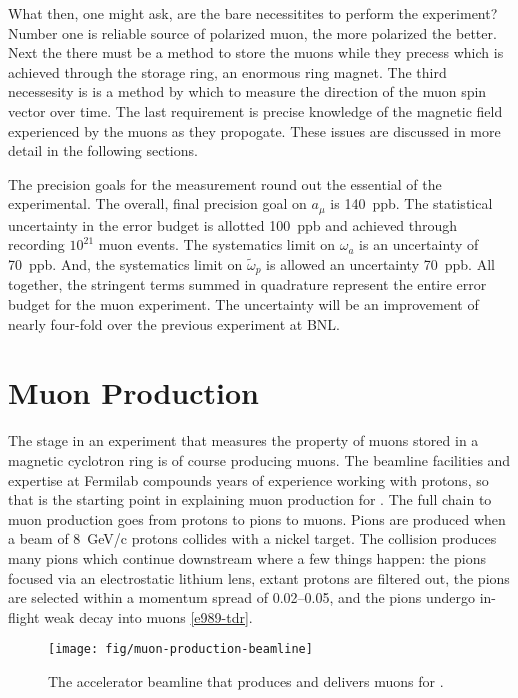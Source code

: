 What then, one might ask, are the bare necessitites to perform the \gmtwo experiment?  Number one is reliable source of polarized muon, the more polarized the better.  Next the there must be a method to store the muons while they precess which is achieved through the \gmtwo storage ring, an enormous ring magnet.  The third necessesity is is a method by which to measure the direction of the muon spin vector over time.  The last requirement is precise knowledge of the magnetic field experienced by the muons as they propogate.  These issues are discussed in more detail in the following sections.

The precision goals for the measurement round out the essential of the experimental.  The overall, final precision goal on $a_\mu$ is \SI{140}{ppb}.  The statistical uncertainty in the error budget is allotted \SI{100}{ppb} and achieved through recording $10^{21}$ muon events.  The systematics limit on $\omega_a$ is an uncertainty of \SI{70}{ppb}.  And, the systematics limit on $\tilde{\omega}_p$ is allowed an uncertainty \SI{70}{ppb}.  All together, the stringent terms summed in quadrature represent the entire error budget for the muon \gmtwo experiment.  The uncertainty will be an improvement of nearly four-fold over the previous experiment at BNL.

\section{Muon Production} \label{sec:muon-production}

The stage in an experiment that measures the property of muons stored in a magnetic cyclotron ring is of course producing muons.  The beamline facilities and expertise at Fermilab compounds years of experience working with protons, so that is the starting point in explaining muon production for \gmtwo.  The full chain to muon production goes from protons to pions to muons.  Pions are produced when a beam of \SI{8}{\GeV/c} protons collides with a nickel target.  The collision produces many pions which continue downstream where a few things happen: the pions focused via an electrostatic lithium lens, extant protons are filtered out, the pions are selected within a momentum spread of \SIrange{0.02}{0.05}{}, and the pions undergo in-flight weak decay into muons \ref{e989-tdr}.

\begin{figure}
\label{fig:muon-production-beamline}
\texttt{[image: fig/muon-production-beamline]}
\caption{The accelerator beamline that produces and delivers muons for \gmtwo. }
\end{figure}

